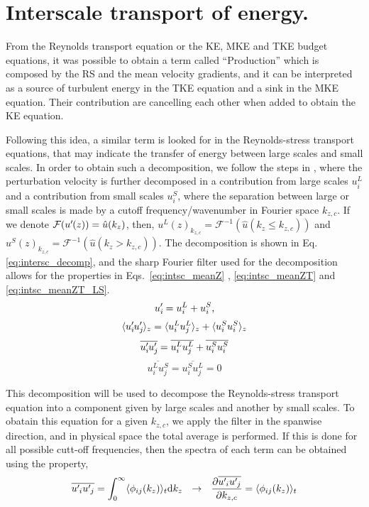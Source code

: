 
\section{Interscale transport of energy.}

From the Reynolds transport equation or the KE, MKE and TKE budget equations, it was possible to obtain a term called ``Production'' which is composed by the RS and the mean velocity gradients, and it can be interpreted as a source of turbulent energy in the TKE equation and a sink in the MKE equation. Their contribution are cancelling each other when added to obtain the KE equation.

Following this idea, a similar term is looked for in the Reynolds-stress transport equations, that may indicate the transfer of energy between large scales and small scales.
In order to obtain such a decomposition, we follow the steps in \cite{PRL2018_Kawata, JFM2019_kawata_alfredsson}, where the perturbation velocity is further decomposed in a contribution from large scales $u_i^L$ and a contribution from small scales $u_i^S$, where the separation between large or small scales is made by a cutoff frequency/wavenumber in Fourier space $k_{z,c}$. If we denote $\mathcal{F}(u^{\prime}\mkern-1.2mu(z)) = \hat{u}(k_z)$, then, $u^L(z)_{k_{z,c}} = \mathcal{F}^{-1}( \hat{u}(k_z \le k_{z,c}) ) $ and $u^S(z)_{k_{z,c}} = \mathcal{F}^{-1}( \hat{u}(k_z > k_{z,c}) ) $.
The decomposition is shown in Eq.\ref{eq:intersc_decomp}, and the sharp Fourier filter used for the decomposition allows for the properties in Eqs.~\ref{eq:intsc_meanZ} , \ref{eq:intsc_meanZT} and \ref{eq:intsc_meanZT_LS}. 
\begin{equation}
    \label{eq:intersc_decomp}
    u_i^{\prime}\mkern-1.2mu = u_i^L + u_i^S,
\end{equation}
\begin{equation}
    \label{eq:intsc_meanZ}
    \langle u_i^{\prime}\mkern-1.2mu u_j^{\prime}\mkern-1.2mu \rangle_z = 
    \langle u_i^L u_j^L \rangle_z + 
    \langle u_i^S u_i^S \rangle_z
\end{equation}
\begin{equation}
    \label{eq:intsc_meanZT}
    \overline{u_i^{\prime}\mkern-1.2mu u_j^{\prime}\mkern-1.2mu} = 
    \overline{ u_i^L u_j^L} + 
    \overline{ u_i^S u_i^S}
\end{equation}
\begin{equation}
    \label{eq:intsc_meanZT_LS}
    \overline{ u_i^L u_j^S} = 
    \overline{ u_i^S u_j^L} = 0
\end{equation}

This decomposition will be used to decompose the Reynolds-stress transport equation into a component given by large scales and another by small scales. To obatain this equation for a given $k_{z,c}$, we apply the filter in the spanwise direction, and in physical space the total average is performed. If this is done for all possible cutt-off frequencies, then the spectra of each term can be obtained using the property,
\begin{equation}
    \label{eq:intsc_der_spec}
    \overline{u^{\prime}\mkern-1.2mu_i u^{\prime}\mkern-1.2mu_j}  = \int_{0}^{\infty} \langle \phi_{ij}(k_z) \rangle_t \mathrm{d}k_z  ~~ \rightarrow ~~ 
    \pdv{\overline{u^{\prime}\mkern-1.2mu_i u^{\prime}\mkern-1.2mu_j}}{k_{z,c}} = \langle \phi_{ij}(k_z) \rangle_t
\end{equation}

